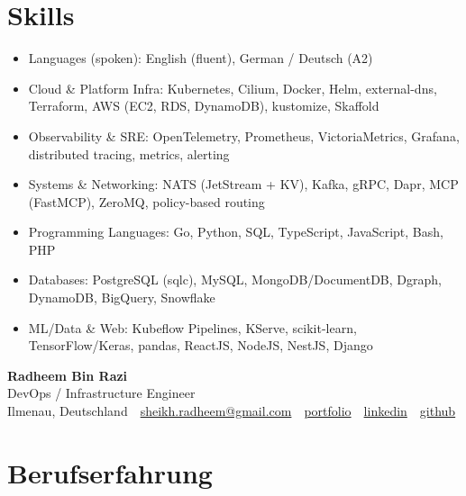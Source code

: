 \documentclass[10pt,a4paper]{resume}
\makeatletter
\newcommand{\Portfolio}{https://radheem.github.io/my-cv}
\newcommand{\PortfolioText}{portfolio}
\newcommand{\GitHub}{https://github.com/radheem}
\newcommand{\LinkedIn}{https://www.linkedin.com/in/radheem-razi}
\newcommand{\Email}{sheikh.radheem@gmail.com}
\makeatother
\begin{document}
\section{Skills}

\begin{itemize}[leftmargin=1.4em,nosep,topsep=2pt]
  \item Languages (spoken): English (fluent), German / Deutsch (A2)
  \item Cloud \& Platform Infra: Kubernetes, Cilium, Docker, Helm, external-dns, Terraform, AWS (EC2, RDS, DynamoDB), kustomize, Skaffold
  \item Observability \& SRE: OpenTelemetry, Prometheus, VictoriaMetrics, Grafana, distributed tracing, metrics, alerting
  \item Systems \& Networking: NATS (JetStream + KV), Kafka, gRPC, Dapr, MCP (FastMCP), ZeroMQ, policy-based routing
  \item Programming Languages: Go, Python, SQL, TypeScript, JavaScript, Bash, PHP
  \item Databases: PostgreSQL (sqlc), MySQL, MongoDB/DocumentDB, Dgraph, DynamoDB, BigQuery, Snowflake
  \item ML/Data \& Web: Kubeflow Pipelines, KServe, scikit-learn, TensorFlow/Keras, pandas, ReactJS, NodeJS, NestJS, Django
\end{itemize}

\clearpage
{}

\begin{center}
  {\huge\bfseries Radheem Bin Razi}\\[3pt]
  {\large DevOps / Infrastructure Engineer}\\[6pt]
  \small
  Ilmenau, Deutschland \,\textbar\,
  \href{mailto:\Email}{\Email} \,\textbar\,
  \href{\Portfolio}{\PortfolioText} \,\textbar\,
  \href{\LinkedIn}{linkedin} \,\textbar\,
  \href{\GitHub}{github}
\end{center}
\vspace{2pt}

\section{Berufserfahrung}
\end{document}
